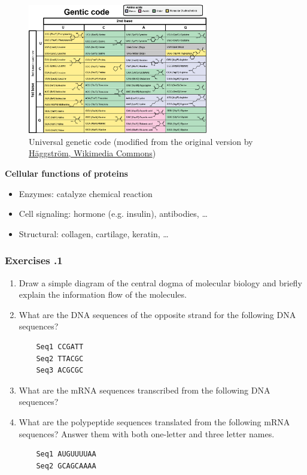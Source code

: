 \begin{figure}[H]
  \centering
      \includegraphics[width=0.7\textwidth]{fig01/genetic_code.png}
  \caption{Universal genetic code \newline (modified from the original version by \href{https://commons.wikimedia.org/wiki/File\%3ANotable_mutations.svg}{H\"aggstr\"om, Wikimedia Commons})}
\end{figure}

\noindent \textbf{Cellular functions of proteins}
\begin{itemize}
\item Enzymes: catalyze chemical reaction
\item Cell signaling: hormone (e.g. insulin), antibodies, …
\item Structural: collagen, cartilage, keratin, …
\end{itemize}

%
%
\subsubsection*{Exercises \thesection.1}
\begin{enumerate}

\item Draw a simple diagram of the central dogma of molecular biology and briefly explain the information flow of the molecules.

\item What are the DNA sequences of the opposite strand for the following DNA sequences?
\begin{verbatim}
    Seq1 CCGATT
    Seq2 TTACGC
    Seq3 ACGCGC
\end{verbatim}

\item What are the mRNA sequences transcribed from the following DNA sequences?

\item What are the polypeptide sequences translated from the following mRNA sequences? Answer them with both one-letter and three letter names.
\begin{verbatim}
    Seq1 AUGUUUUAA
    Seq2 GCAGCAAAA
\end{verbatim}
		
\end{enumerate}

%

